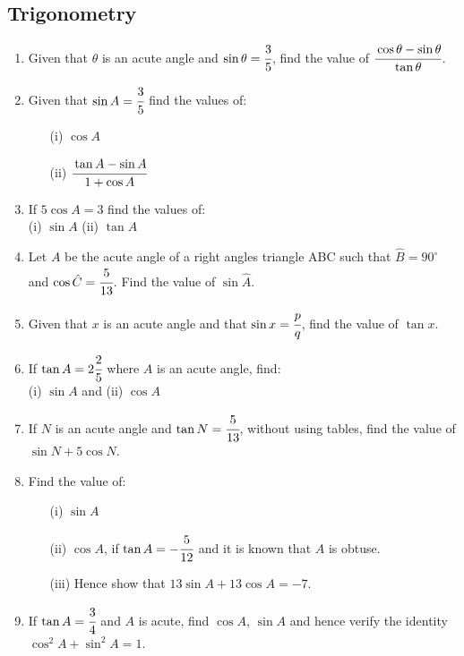 	\subsection{Trigonometry} \label{f4trig}
\begin{enumerate}

	\item Given that $\theta$ is an acute angle and $\sin \theta = \cfrac{3}{5}$, find the value of $\cfrac{\cos \theta - \sin \theta}{\tan \theta}$.

	\item Given that $\sin A = \cfrac{3}{5}$ find the values of:
		\begin{itemize}
		\item[(i)] $\cos A$
		\item[(ii)] $\cfrac{\tan A - \sin A}{1 + \cos A}$
		\end{itemize}

	\item If $5\cos A = 3$ find the values of:\\
	(i) $\sin A$ \quad	(ii) $\tan A$
	
	\item Let $A$ be the acute angle of a right angles triangle ABC such that $\hat{B} = 90^\circ$ and $\cos \hat{C} = \cfrac{5}{13}$. Find the value of $\sin \hat{A}$.
	
	\item Given that $x$ is an acute angle and that $\sin x = \cfrac{p}{q}$, find the value of $\tan x$.
	
	\item If $\tan A = 2\cfrac{2}{5}$ where $A$ is an acute angle, find:\\
	(i) $\sin A$ \quad and \quad (ii) $\cos A$
	
	\item If $N$ is an acute angle and $\tan N = \cfrac{5}{13}$, without using tables, find the value of $\sin N + 5\cos N$.
	
	\item Find the value of:
		\begin{itemize}
		\item[(i)] $\sin A$
		\item[(ii)] $\cos A$, if $\tan A = -\cfrac{5}{12}$ and it is known that $A$ is obtuse.
		\item[(iii)] Hence show that $13\sin A + 13\cos A = -7$.
		\end{itemize}

	\item If $\tan A = \cfrac{3}{4}$ and $A$ is acute, find $\cos A$, $\sin A$ and hence verify the identity $\cos^2 A + \sin^2 A = 1$.
	

\end{enumerate}
